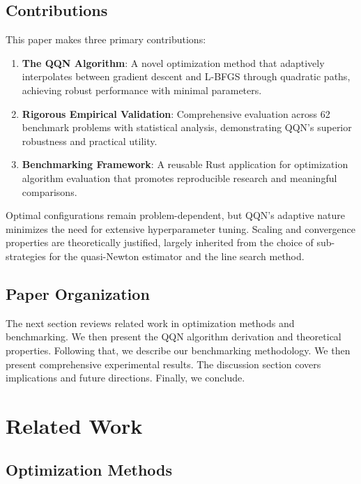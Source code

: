 \hypertarget{contributions}{%
\subsection{Contributions}\label{contributions}}

This paper makes three primary contributions:

\begin{enumerate}
\def\labelenumi{\arabic{enumi}.}
\tightlist
\item
  \textbf{The QQN Algorithm}: A novel optimization method that adaptively interpolates between gradient descent and L-BFGS through quadratic paths, achieving robust performance with minimal parameters.
\item
  \textbf{Rigorous Empirical Validation}: Comprehensive evaluation across 62 benchmark problems with statistical analysis, demonstrating QQN's superior robustness and practical utility.
\item
  \textbf{Benchmarking Framework}: A reusable Rust application for optimization algorithm evaluation that promotes reproducible research and meaningful comparisons.
\end{enumerate}

Optimal configurations remain problem-dependent, but QQN's adaptive nature minimizes the need for extensive hyperparameter tuning.
Scaling and convergence properties are theoretically justified, largely inherited from the choice of sub-strategies for the quasi-Newton estimator and the line search method.

\hypertarget{paper-organization}{%
\subsection{Paper Organization}\label{paper-organization}}

The next section reviews related work in optimization methods and benchmarking.
We then present the QQN algorithm derivation and theoretical properties.
Following that, we describe our benchmarking methodology.
We then present comprehensive experimental results.
The discussion section covers implications and future directions.
Finally, we conclude.

\hypertarget{related-work}{%
\section{Related Work}\label{related-work}}

\hypertarget{optimization-methods}{%
\subsection{Optimization Methods}\label{optimization-methods}}


